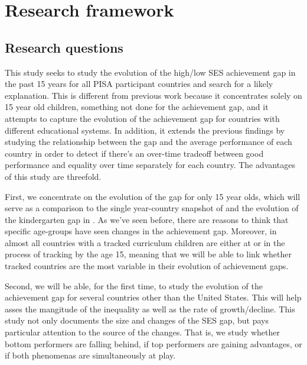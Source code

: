 \documentclass[11pt, a4paper]{article}\usepackage[]{graphicx}\usepackage[]{color}
\begin{document}

\section{Research framework}

\subsection{Research questions}

This study seeks to study the evolution of the high/low SES achievement gap in the past 15 years for all PISA participant countries and search for a likely explanation. This is different from previous work because it concentrates solely on 15 year old children, something not done for the achievement gap, and it attempts to capture the evolution of the achievement gap for countries with different educational systems. In addition, it extends the previous findings by studying the relationship between the gap and the average performance of each country in order to detect if there's an over-time tradeoff between good performance and equality over time separately for each country. The advantages of this study are threefold.

First, we concentrate on the evolution of the gap for only 15 year olds, which will serve as a comparison to the single year-country snapshot of \citet{anna2016} and the evolution of the kindergarten gap in \citet{reardon_portilla}. As we've seen before, there are reasons to think that specific age-groups have seen changes in the achievement gap. Moreover, in almost all countries with a tracked curriculum children are either at or in the process of tracking by the age 15, meaning that we will be able to link whether tracked countries are the most variable in their evolution of achievement gaps.

Second, we will be able, for the first time, to study the evolution of the achievement gap for several countries other than the United States. This will help asses the mangitude of the inequality as well as the rate of growth/decline. This study not only documents the size and changes of the SES gap, but pays particular attention to the source of the changes. That is, we study whether bottom performers are falling behind, if top performers are gaining advantages, or if both phenomenas are simultaneously at play.
\end{document}
